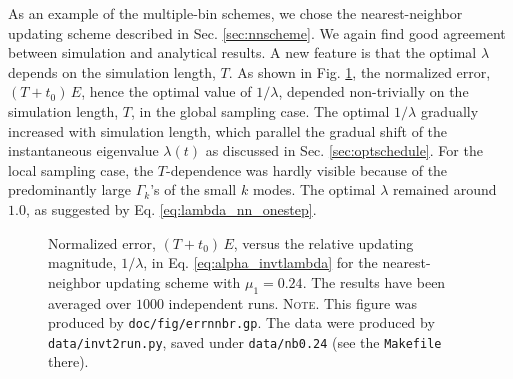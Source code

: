 \documentclass[reprint, floatfix]{revtex4-1}
\newcommand{\note}[1]{{\color{DarkGreen}\footnotesize \textsc{Note.} #1}}
\newcommand{\Err}{E}
\begin{document}
As an example of the multiple-bin schemes,
we chose the nearest-neighbor updating scheme
described in Sec. \eqref{sec:nnscheme}.
%
We again find good agreement
between simulation and analytical results.
%
A new feature is that the optimal $\lambda$
depends on the simulation length, $T$.
%
As shown in Fig. \ref{fig:errnnbr},
the normalized error, $(T + t_0) \, \Err$,
hence the optimal value of $1/\lambda$,
depended non-trivially on the simulation length, $T$,
in the global sampling case.
%
The optimal $1/\lambda$ gradually increased
with simulation length,
which parallel the gradual shift of
the instantaneous eigenvalue $\lambda(t)$
as discussed in Sec. \ref{sec:optschedule}.
%
For the local sampling case,
the $T$-dependence was hardly visible
because of the predominantly large $\Gamma_k$'s
of the small $k$ modes.
%
The optimal $\lambda$ remained around $1.0$,
as suggested by Eq. \eqref{eq:lambda_nn_onestep}.





\begin{figure}[h]
\begin{center}
  \caption{
    \label{fig:errnnbr}
    Normalized error, $(T + t_0) \, E$,
    versus the %
    relative updating magnitude,
    $1/\lambda$,
    in Eq. \eqref{eq:alpha_invtlambda}
    for the nearest-neighbor updating scheme with $\mu_1 = 0.24$.
    The results have been averaged over $1000$ independent runs.
    \note{This figure was produced by \texttt{doc/fig/errnnbr.gp}.
      The data were produced by \texttt{data/invt2run.py},
      saved under \texttt{data/nb0.24}
      (see the \texttt{Makefile} there).
    }
  }
\end{center}
\end{figure}
\end{document}

